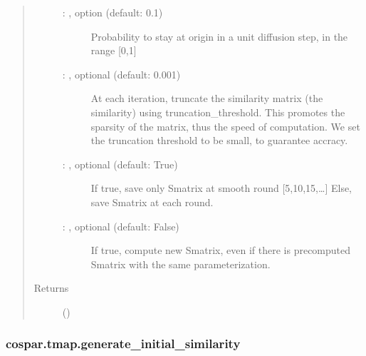 \documentclass[letterpaper,10pt,english]{sphinxmanual}
\begin{document}
\begin{fulllineitems}
\begin{quote}
\begin{description}
\begin{description}
\item[{ : , option (default: 0.1)}] \leavevmode
Probability to stay at origin in a unit diffusion step, in the range {[}0,1{]}

\item[{ : , optional (default: 0.001)}] \leavevmode
At each iteration, truncate the similarity matrix (the similarity) using
truncation\_threshold. This promotes the sparsity of the matrix,
thus the speed of computation. We set the truncation threshold to be small,
to guarantee accracy.

\item[{ : , optional (default: True)}] \leavevmode
If true, save only Smatrix at smooth round {[}5,10,15,…{]}
Else, save Smatrix at each round.

\item[{ : , optional (default: False)}] \leavevmode
If true, compute new Smatrix, even if there is pre\sphinxhyphen{}computed Smatrix with the
same parameterization.

\end{description}

\item[{Returns}] \leavevmode
{} ()

\end{description}\end{quote}

\end{fulllineitems}



\subsubsection{cospar.tmap.generate\_initial\_similarity}
\label{\detokenize{cospar.tmap.generate_initial_similarity:cospar-tmap-generate-initial-similarity}}\label{\detokenize{cospar.tmap.generate_initial_similarity::doc}}
\end{document}
